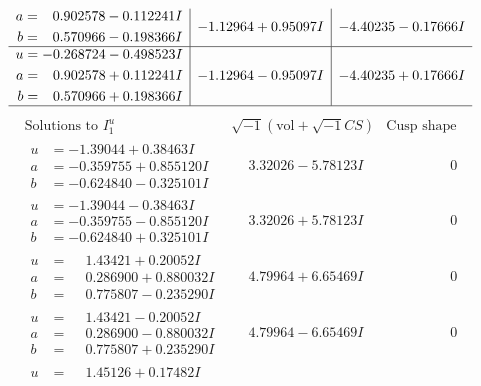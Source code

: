 \documentclass[1p]{elsarticle_modified}
\theoremstyle{definition}
\newcommand{\I}{\sqrt{-1}}
\begin{document}
$$\begin{array}{c|c|c}
\begin{aligned}
a &= \phantom{-}0.902578 - 0.112241 I \\
b &= \phantom{-}0.570966 - 0.198366 I\end{aligned}
 & -1.12964 + 0.95097 I & -4.40235 - 0.17666 I \\ \hline\begin{aligned}
u &= -0.268724 - 0.498523 I \\
a &= \phantom{-}0.902578 + 0.112241 I \\
b &= \phantom{-}0.570966 + 0.198366 I\end{aligned}
 & -1.12964 - 0.95097 I & -4.40235 + 0.17666 I\\
 \hline 
 \end{array}$$\newpage$$\begin{array}{c|c|c}  
\text{Solutions to }I^u_{1}& \I (\text{vol} + \sqrt{-1}CS) & \text{Cusp shape}\\
 \hline 
\begin{aligned}
u &= -1.39044 + 0.38463 I \\
a &= -0.359755 + 0.855120 I \\
b &= -0.624840 - 0.325101 I\end{aligned}
 & \phantom{-}3.32026 - 5.78123 I & \phantom{-0.000000 } 0 \\ \hline\begin{aligned}
u &= -1.39044 - 0.38463 I \\
a &= -0.359755 - 0.855120 I \\
b &= -0.624840 + 0.325101 I\end{aligned}
 & \phantom{-}3.32026 + 5.78123 I & \phantom{-0.000000 } 0 \\ \hline\begin{aligned}
u &= \phantom{-}1.43421 + 0.20052 I \\
a &= \phantom{-}0.286900 + 0.880032 I \\
b &= \phantom{-}0.775807 - 0.235290 I\end{aligned}
 & \phantom{-}4.79964 + 6.65469 I & \phantom{-0.000000 } 0 \\ \hline\begin{aligned}
u &= \phantom{-}1.43421 - 0.20052 I \\
a &= \phantom{-}0.286900 - 0.880032 I \\
b &= \phantom{-}0.775807 + 0.235290 I\end{aligned}
 & \phantom{-}4.79964 - 6.65469 I & \phantom{-0.000000 } 0 \\ \hline\begin{aligned}
u &= \phantom{-}1.45126 + 0.17482 I \\

\end{aligned}
\end{array}$$
\end{document}
